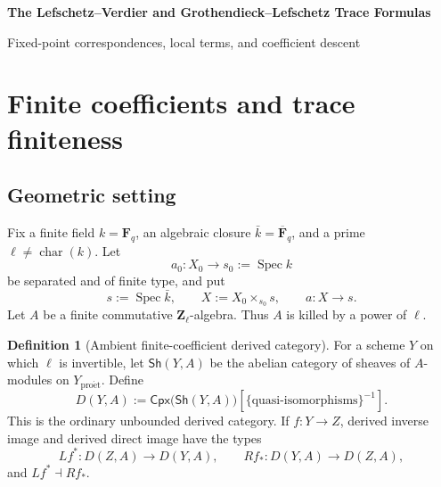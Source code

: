 \documentclass[10pt]{article}
\theoremstyle{definition}
\newtheorem{definition}[theorem]{Definition}
\newcommand{\Fq}{\mathbf F_q}
\newcommand{\Fbar}{\overline{\mathbf F}_q}
\newcommand{\Zl}{\mathbf Z_\ell}
\newcommand{\Spec}{\operatorname{Spec}}
\begin{document}
\begin{center}
{\large\bfseries The Lefschetz--Verdier and Grothendieck--Lefschetz Trace Formulas\par}
\medskip
{\normalsize Fixed-point correspondences, local terms, and coefficient descent\par}
\end{center}

\begin{abstract}
The Lefschetz--Verdier formula is formulated for cohomological
correspondences with proper fixed scheme.  Its constituent statements cover
extension by zero, localization, deformation to the normal cone, purity,
fixed-point transversality, and adic reconstruction.  Scheme Frobenius and
Galois Frobenius are distinguished throughout.  Every derived category below
is an ordinary Verdier-localized triangulated category.
\end{abstract}

\tableofcontents

\section{Finite coefficients and trace finiteness}

\subsection{Geometric setting}

Fix a finite field \(k=\Fq\), an algebraic closure \(\bar k=\Fbar\), and a
prime \(\ell\ne\operatorname{char}(k)\).  Let
\[
 a_0:X_0\longrightarrow s_0:=\Spec k
\]
be separated and of finite type, and put
\[
 s:=\Spec\bar k,\qquad X:=X_0\times_{s_0}s,\qquad a:X\to s.
\]
Let \(A\) be a finite commutative \(\Zl\)-algebra.  Thus \(A\) is killed by
a power of \(\ell\).

\begin{definition}[Ambient finite-coefficient derived category]
For a scheme \(Y\) on which \(\ell\) is invertible, let
\(\mathsf{Sh}(Y,A)\) be the abelian category of sheaves of \(A\)-modules on
\(Y_{\mathrm{pro\acute et}}\).  Define
\[
 D(Y,A):=
 \mathsf{Cpx}\bigl(\mathsf{Sh}(Y,A)\bigr)
 [\{\text{quasi-isomorphisms}\}^{-1}].
\]
This is the ordinary unbounded derived category.  If \(f:Y\to Z\), derived
inverse image and derived direct image have the types
\[
 Lf^*:D(Z,A)\longrightarrow D(Y,A),\qquad
 Rf_*:D(Y,A)\longrightarrow D(Z,A),
\]
and \(Lf^*\dashv Rf_*\).
\end{definition}
\end{document}
